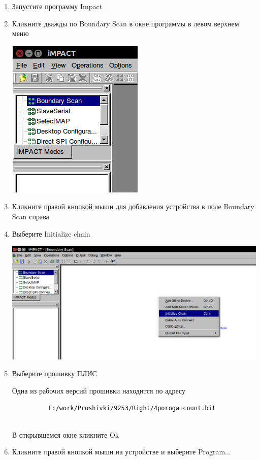 \documentclass[]{article}
\begin{document}
\begin{enumerate}
\def\labelenumi{\arabic{enumi}.}
\item
  Запустите программу Impact
\item
  Кликните дважды по Boundary Scan в окне программы в левом верхнем меню

  \includegraphics{./imgs/firmware_FPGA_win_Bounddary_Scan.png}
\item
  Кликните правой кнопкой мыши для добавления устройства в поле Boundary
  Scan справа
\item
  Выберите Initialize chain

  \includegraphics{./imgs/firmware_FPGA_win_Add_device.png}
\item
  Выберите прошивку ПЛИС

  Одна из рабочих версий прошивки находится по адресу

\begin{verbatim}
          E:/work/Proshivki/9253/Right/4poroga+count.bit
        
\end{verbatim}

  В открывшемся окне кликните Ok
\item
  Кликните правой кнопкой мыши на устройстве и выберите Program...


\end{enumerate}
\end{document}
